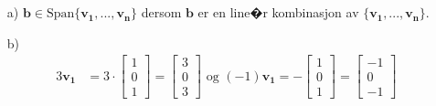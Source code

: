 \documentclass[a4paper, norsk, 12pt]{extarticle}
\begin{document}
\section{}
\begin{itemize}

\item[a)]
$\mathbf{b} \in \text{Span} \{\mathbf{v_1},...,\mathbf{v_n}\}$ dersom $\mathbf{b}$ er en line�r kombinasjon av $\{\mathbf{v_1},...,\mathbf{v_n}\}$.

\item[b)]
\begin{align*}
    3\mathbf{v_1} &= 3 \cdot \begin{bmatrix}  1 \\  0 \\ 1  \end{bmatrix} = \begin{bmatrix} 3 \\ 0 \\ 3  \end{bmatrix}
         \text{  og  }
    (-1)\mathbf{v_1} = - \begin{bmatrix}  1 \\  0 \\ 1  \end{bmatrix}  = \begin{bmatrix} -1 \\ 0 \\ -1 \end{bmatrix}
\end{align*}


\end{itemize}
\end{document}
